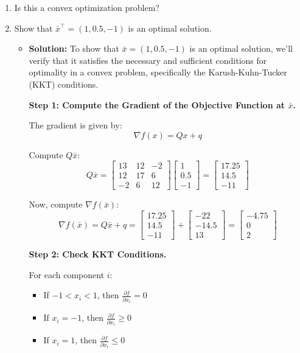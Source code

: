 \documentclass{article}
\begin{document}
\begin{enumerate}[label=(\alph*)]
\item Is this a convex optimization problem?

\item Show that $\bar{x}^\top = (1, 0.5, -1)$ is an optimal solution.

\begin{itemize}
\item[] \textbf{Solution:}
To show that $\bar{x} = (1, 0.5, -1)$ is an optimal solution, we'll verify that it satisfies the necessary and sufficient conditions for optimality in a convex problem, specifically the Karush-Kuhn-Tucker (KKT) conditions.

\textbf{Step 1: Compute the Gradient of the Objective Function at $\bar{x}$.}

The gradient is given by:
\[
\nabla f(x) = Q x + q
\]

Compute $Q \bar{x}$:
\[
Q \bar{x} = \begin{bmatrix}
13 & 12 & -2 \\
12 & 17 & 6 \\
-2 & 6 & 12
\end{bmatrix} \begin{bmatrix}
1 \\
0.5 \\
-1
\end{bmatrix} = \begin{bmatrix}
17.25 \\
14.5 \\
-11
\end{bmatrix}
\]

Now, compute $\nabla f(\bar{x})$:
\[
\nabla f(\bar{x}) = Q \bar{x} + q = \begin{bmatrix}
17.25 \\
14.5 \\
-11
\end{bmatrix} + \begin{bmatrix}
-22 \\
-14.5 \\
13
\end{bmatrix} = \begin{bmatrix}
-4.75 \\
0 \\
2
\end{bmatrix}
\]

\textbf{Step 2: Check KKT Conditions.}

For each component $i$:
\begin{itemize}
\item If $-1 < x_i < 1$, then $\frac{\partial f}{\partial x_i} = 0$
\item If $x_i = -1$, then $\frac{\partial f}{\partial x_i} \geq 0$
\item If $x_i = 1$, then $\frac{\partial f}{\partial x_i} \leq 0$
\end{itemize}


\end{itemize}
\end{enumerate}
\end{document}
